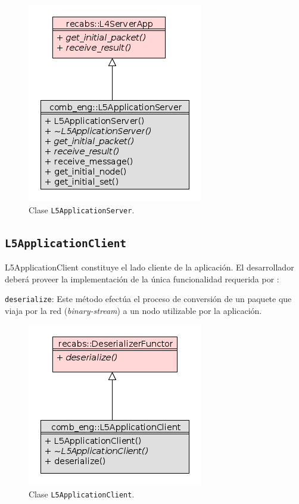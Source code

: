 			\begin{figure}[H] \hspace{3.6cm}
       	\includegraphics[scale=.56]{images/l5app_server_class.png}
        \caption{Clase \texttt{L5ApplicationServer}.}
        \label{l5AppServerClass}
 	    \end{figure}
        	
		\subsection{\texttt{L5ApplicationClient}}
		L5ApplicationClient constituye el lado cliente de la aplicaci\'on. El desarrollador deber\'a proveer la implementaci\'on de la \'unica funcionalidad requerida por \combeng:
  		\begin {description}
		  \item \texttt {deserialize}: Este m\'etodo efect\'ua el proceso de conversi\'on de un paquete que viaja por la red (\emph {binary-stream}) a un nodo utilizable por la aplicaci\'on. 
		\end {description}


			\begin{figure}[H] \hspace{3.6cm}
        \includegraphics[scale=.56]{images/l5app_client_class.png}
        \caption{Clase \texttt{L5ApplicationClient}.}
        \label{l5AppClientClass}
 	    \end{figure}
